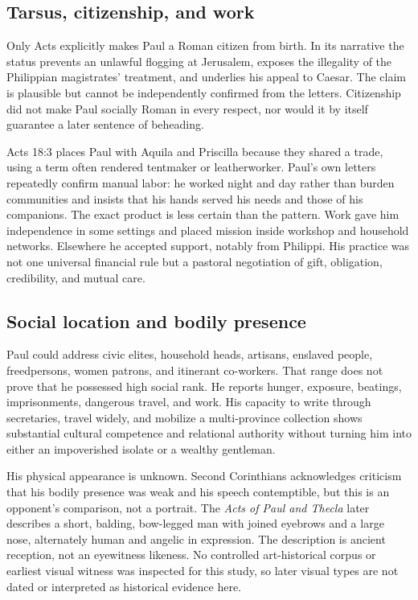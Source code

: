 \subsection{Tarsus, citizenship, and work}

Only Acts explicitly makes Paul a Roman citizen from birth. In its narrative
the status prevents an unlawful flogging at Jerusalem, exposes the illegality
of the Philippian magistrates' treatment, and underlies his appeal to Caesar.
The claim is plausible but cannot be independently confirmed from the
letters. Citizenship did not make Paul socially Roman in every respect, nor
would it by itself guarantee a later sentence of beheading.

Acts 18:3 places Paul with Aquila and Priscilla because they shared a trade,
using a term often rendered tentmaker or leatherworker. Paul's own letters
repeatedly confirm manual labor: he worked night and day rather than burden
communities and insists that his hands served his needs and those of his
companions. The exact product is less certain than the pattern. Work gave him
independence in some settings and placed mission inside workshop and household
networks. Elsewhere he accepted support, notably from Philippi. His practice
was not one universal financial rule but a pastoral negotiation of gift,
obligation, credibility, and mutual care.

\subsection{Social location and bodily presence}

Paul could address civic elites, household heads, artisans, enslaved people,
freedpersons, women patrons, and itinerant co-workers. That range does not
prove that he possessed high social rank. He reports hunger, exposure,
beatings, imprisonments, dangerous travel, and work. His capacity to write
through secretaries, travel widely, and mobilize a multi-province collection
shows substantial cultural competence and relational authority without
turning him into either an impoverished isolate or a wealthy gentleman.

His physical appearance is unknown. Second Corinthians acknowledges criticism
that his bodily presence was weak and his speech contemptible, but this is an
opponent's comparison, not a portrait. The \emph{Acts of Paul and Thecla}
later describes a short, balding, bow-legged man with joined eyebrows and a
large nose, alternately human and angelic in expression. The description is
ancient reception, not an eyewitness likeness. No controlled art-historical
corpus or earliest visual witness was inspected for this study, so later
visual types are not dated or interpreted as historical evidence here.

